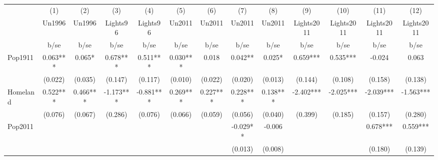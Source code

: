 {
\def\sym#1{\ifmmode^{#1}\else\(^{#1}\)\fi}
\begin{tabular}{l*{12}{c}}
\hline\hline
                    &\multicolumn{1}{c}{(1)}&\multicolumn{1}{c}{(2)}&\multicolumn{1}{c}{(3)}&\multicolumn{1}{c}{(4)}&\multicolumn{1}{c}{(5)}&\multicolumn{1}{c}{(6)}&\multicolumn{1}{c}{(7)}&\multicolumn{1}{c}{(8)}&\multicolumn{1}{c}{(9)}&\multicolumn{1}{c}{(10)}&\multicolumn{1}{c}{(11)}&\multicolumn{1}{c}{(12)}\\
                    &\multicolumn{1}{c}{Un1996}&\multicolumn{1}{c}{Un1996}&\multicolumn{1}{c}{Lights96}&\multicolumn{1}{c}{Lights96}&\multicolumn{1}{c}{Un2011}&\multicolumn{1}{c}{Un2011}&\multicolumn{1}{c}{Un2011}&\multicolumn{1}{c}{Un2011}&\multicolumn{1}{c}{Lights2011}&\multicolumn{1}{c}{Lights2011}&\multicolumn{1}{c}{Lights2011}&\multicolumn{1}{c}{Lights2011}\\
                    &        b/se   &        b/se   &        b/se   &        b/se   &        b/se   &        b/se   &        b/se   &        b/se   &        b/se   &        b/se   &        b/se   &        b/se   \\
\hline
Pop1911             &       0.063***&       0.065*  &       0.678***&       0.511***&       0.030***&       0.018   &       0.042** &       0.025*  &       0.659***&       0.535***&      -0.024   &       0.063   \\
                    &     (0.022)   &     (0.035)   &     (0.147)   &     (0.117)   &     (0.010)   &     (0.022)   &     (0.020)   &     (0.013)   &     (0.144)   &     (0.108)   &     (0.158)   &     (0.138)   \\
Homeland            &       0.522***&       0.466***&      -1.173***&      -0.881***&       0.269***&       0.227***&       0.228***&       0.138***&      -2.402***&      -2.025***&      -2.039***&      -1.563***\\
                    &     (0.076)   &     (0.067)   &     (0.286)   &     (0.076)   &     (0.066)   &     (0.059)   &     (0.056)   &     (0.040)   &     (0.399)   &     (0.185)   &     (0.157)   &     (0.280)   \\
Pop2011             &               &               &               &               &               &               &      -0.029** &      -0.006   &               &               &       0.678***&       0.559***\\
                    &               &               &               &               &               &               &     (0.013)   &     (0.008)   &               &               &     (0.180)   &     (0.139)   \\

\end{tabular}}
